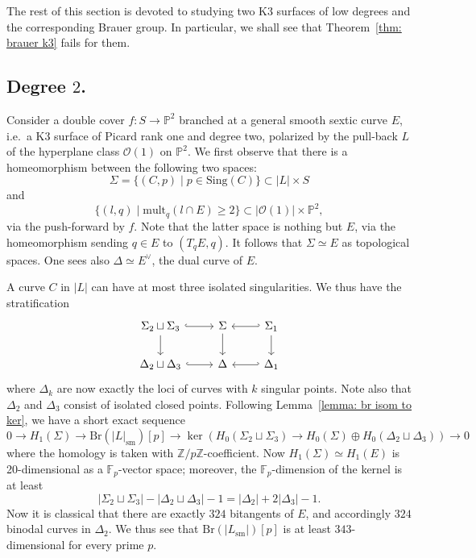 \documentclass[11pt]{amsart}
\theoremstyle{plain}
\theoremstyle{definition}
\theoremstyle{remark}
\begin{document}
The rest of this section is devoted to studying two K3 surfaces of low degrees and the corresponding Brauer group. In particular, we shall see that Theorem~\ref{thm: brauer k3} fails for them.

\subsection{Degree $2$.} Consider a double cover $f: S \to \mathbb P^2$ branched at a general smooth sextic curve $E$, i.e.~a K3 surface of Picard rank one and degree two, polarized by the pull-back $L$ of the hyperplane class $\mathcal O(1)$ on $\mathbb P^2$. 
We first observe that there is a homeomorphism between the following two spaces:
\[
\Sigma = \{(C, p) \mid p \in \mathrm{Sing}(C)\} \subset |L| \times S
\]
and 
\[
\{(l, q) \mid \mathrm{mult}_q(l \cap E) \geq 2\} \subset |\mathcal O(1)| \times \mathbb P^2,
\]
via the push-forward by $f$. Note that the latter space is nothing but $E$, via the homeomorphism sending $q \in E$ to $(T_q E, q)$. It follows that $\Sigma \simeq E$ as topological spaces. One sees also $\Delta \simeq E^\vee$, the dual curve of $E$.

A curve $C$ in $|L|$ can have at most three isolated singularities. We thus have the stratification
\[\begin{tikzcd}
	{\Sigma_{2} \sqcup \Sigma_3} & \Sigma & {\Sigma_1} \\
	{\Delta_{2} \sqcup \Delta_3} & \Delta & {\Delta_1}
	\arrow[hook, from=1-1, to=1-2]
	\arrow[from=1-1, to=2-1]
	\arrow[from=1-2, to=2-2]
	\arrow[hook', from=1-3, to=1-2]
	\arrow[from=1-3, to=2-3]
	\arrow[hook, from=2-1, to=2-2]
	\arrow[hook', from=2-3, to=2-2]
\end{tikzcd}\]
where $\Delta_k$ are now exactly the loci of curves with $k$ singular points. Note also that $\Delta_2$ and $\Delta_3$ consist of isolated closed points. Following Lemma~\ref{lemma: br isom to ker}, we have a short exact sequence
\[
0\to H_1(\Sigma) \to \mathrm{Br}(|L|_\mathrm{sm})[p] \to \ker\left(H_0(\Sigma_{2} \sqcup \Sigma_3) \to H_0 (\Sigma) \oplus H_0(\Delta_{2}\sqcup \Delta_3) \right) \to 0
\]
where the homology is taken with $\mathbb Z/p \mathbb Z$-coefficient. Now $H_1(\Sigma)\simeq H_1(E)$ is 20-dimensional as a $\mathbb F_p$-vector space; moreover, the $\mathbb F_p$-dimension of the kernel is at least
\[
|\Sigma_2 \sqcup \Sigma_3| - |\Delta_2 \sqcup \Delta_3| - 1 = |\Delta_2| + 2 |\Delta_3| - 1.
\]
Now it is classical that there are exactly $324$ bitangents of $E$, and accordingly $324$ binodal curves in $\Delta_2$. We thus see that $\mathrm{Br}(|L_\mathrm{sm}|)[p]$ is at least $343$-dimensional for every prime $p$. 
\end{document}
